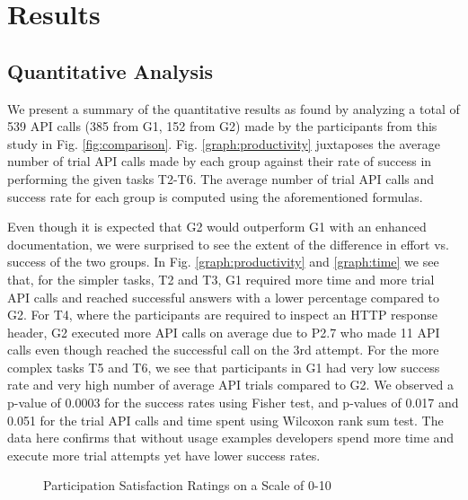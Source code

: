 \section{Results}
\label{sec:results}


\subsection{Quantitative Analysis} %


We present a summary of the quantitative results as found by analyzing a total of 539 API calls (385 from G1, 152 from G2) made by the participants from this study in Fig. \ref{fig:comparison}. Fig. \ref{graph:productivity} juxtaposes the average number of trial API calls made by each group against their rate of success in performing the given tasks T2-T6. The average number of trial API calls and success rate for each group is computed using the aforementioned formulas.

Even though it is expected that G2 would outperform G1 with an enhanced documentation, we were surprised to see the extent of the difference in effort vs. success of the two groups. In Fig. \ref{graph:productivity} and \ref{graph:time} we see that, for the simpler tasks, T2 and T3, G1 required more time and more trial API calls and reached successful answers with a lower percentage compared to G2. For T4, where the participants are required to inspect an HTTP response header, G2 executed more API calls on average due to P2.7 who made 11 API calls even though reached the successful call on the 3rd attempt. For the more complex tasks T5 and T6, we see that participants in G1 had very low success rate and very high number of average API trials compared to G2. We observed a p-value of 0.0003 for the success rates using Fisher test, and p-values of 0.017  and 0.051 for the trial API calls and time spent using Wilcoxon rank sum test. The data here confirms that without usage examples developers spend more time and execute more trial attempts yet have lower success rates.

\begin{figure}[h]
\centering

\caption{Participation Satisfaction Ratings on a Scale of 0-10}
\label{fig:rating}

\end{figure}

